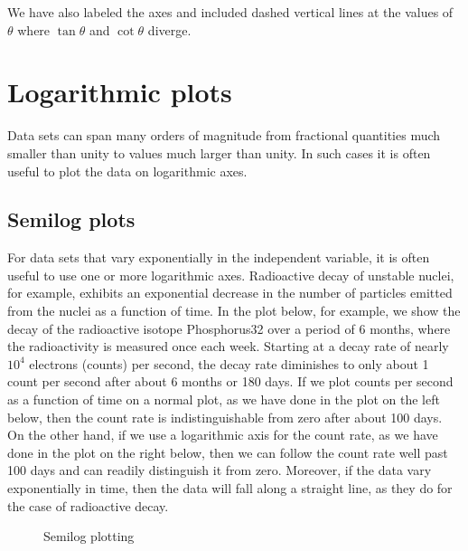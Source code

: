 \documentclass[letterpaper,10pt,english]{sphinxmanual}
\begin{document}
\sphinxAtStartPar
We have also labeled the axes and included dashed vertical lines at the values of \(\theta\) where \(\tan\theta\) and \(\cot\theta\) diverge.


\section{Logarithmic plots}
\label{\detokenize{chap5/chap5_plot:logarithmic-plots}}
\ignorespaces 
\sphinxAtStartPar
Data sets can span many orders of magnitude from fractional quantities much smaller than unity to values much larger than unity.  In such cases it is often useful to plot the data on logarithmic axes.


\subsection{Semi\sphinxhyphen{}log plots}
\label{\detokenize{chap5/chap5_plot:semi-log-plots}}
\ignorespaces 
\sphinxAtStartPar
For data sets that vary exponentially in the independent variable, it is often useful to use one or more logarithmic axes.  Radioactive decay of unstable nuclei, for example, exhibits an exponential decrease in the number of particles emitted from the nuclei as a function of time.  In the plot below, for example, we show the decay of the radioactive isotope Phosphorus\sphinxhyphen{}32 over a period of 6 months, where the radioactivity is measured once each week.  Starting at a decay rate of nearly \(10^4\) electrons (counts) per second, the decay rate diminishes to only about 1 count per second after about 6 months or 180 days.  If we plot counts per second as a function of time on a normal plot, as we have done in the plot on the left below, then the count rate is indistinguishable from zero after about 100 days.  On the other hand, if we use a logarithmic axis for the count rate, as we have done in the plot on the right below, then we can follow the count rate well past 100 days and can readily distinguish it from zero.  Moreover, if the data vary exponentially in time, then the data will fall along a straight line, as they do for the case of radioactive decay.

\begin{figure}[htbp]
\centering
\capstart

\noindent{}
\caption{Semi\sphinxhyphen{}log plotting}\label{\detokenize{chap5/chap5_plot:id9}}\label{\detokenize{chap5/chap5_plot:fig-semilogdemo}}\end{figure}
\end{document}

